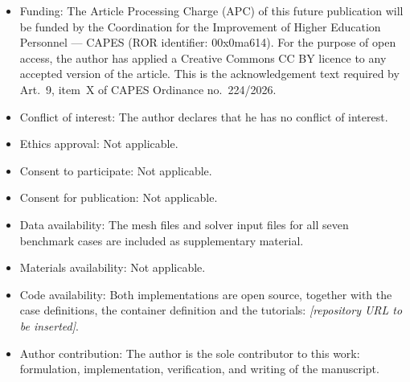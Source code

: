 \documentclass[pdflatex,sn-mathphys-num]{sn-jnl}
\theoremstyle{thmstyleone}%
\theoremstyle{thmstyletwo}%
\theoremstyle{thmstylethree}%
\begin{document}
\begin{itemize}
\item Funding: The Article Processing Charge (APC) of this future publication
      will be funded by the Coordination for the Improvement of Higher Education
      Personnel --- CAPES (ROR identifier: 00x0ma614). For the purpose of open
      access, the author has applied a Creative Commons CC BY licence to any
      accepted version of the article. This is the acknowledgement text required
      by Art.~9, item~X of CAPES Ordinance no.~224/2026.
\item Conflict of interest: The author declares that he has no conflict of
      interest.
\item Ethics approval: Not applicable.
\item Consent to participate: Not applicable.
\item Consent for publication: Not applicable.
\item Data availability: The mesh files and solver input files for all seven
      benchmark cases are included as supplementary material.
\item Materials availability: Not applicable.
\item Code availability: Both implementations are open source, together with the
      case definitions, the container definition and the tutorials:
      \emph{[repository URL to be inserted]}.
\item Author contribution: The author is the sole contributor to this work:
      formulation, implementation, verification, and writing of the manuscript.
\end{itemize}
\end{document}
